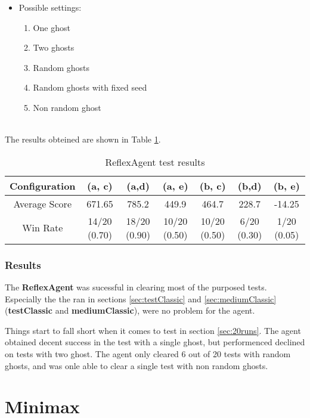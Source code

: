 \documentclass{article}
\begin{document}
\begin{itemize}
  \item Possible settings:
  \begin{enumerate}[label=(\alph*)]
    \item One ghost
    \item Two ghosts
    \item Random ghosts
    \item Random ghosts with fixed seed
    \item Non random ghost
  \end{enumerate}
\end{itemize}

~\\
The results obteined are shown in Table \ref{tab:reflexagent}.

\begin{table}[!ht]
  \begin{center}
  \begin{tabular}{||c||c|c|c|c|c|c||}
  \hline
  Configuration & (a, c) & (a,d) & (a, e) & (b, c) & (b,d) & (b, e) \\
  \hline\hline
  Average Score & 671.65 & 785.2 & 449.9 & 464.7 & 228.7 & -14.25 \\
  \hline\hline
  Win Rate & 14/20 (0.70) & 18/20 (0.90) & 10/20 (0.50) & 10/20 (0.50) & 6/20 (0.30) & 1/20 (0.05) \\
  \hline
  \end{tabular}
  \caption{ReflexAgent test results}
  \label{tab:reflexagent}
  \end{center}
\end{table}

\subsubsection{Results}
The \textbf{ReflexAgent} was sucessful in clearing most of the purposed tests. Especially the the ran in sections \ref{sec:testClassic} and \ref{sec:mediumClassic} (\textbf{testClassic} and \textbf{mediumClassic}), were no problem for the agent.

Things start to fall short when it comes to test in section \ref{sec:20runs}. The agent obtained decent success in the test with a single ghost, but performenced declined on tests with two ghost. The agent only cleared 6 out of 20 tests with random ghosts, and was onle able to clear a single test with non random ghosts.

\pagebreak
\section{Minimax}
\end{document}
